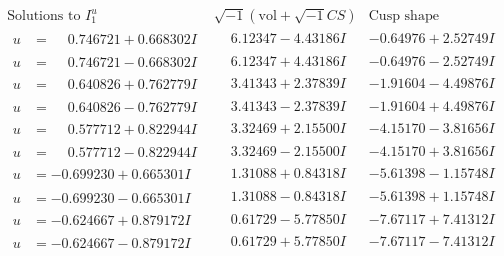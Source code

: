 \documentclass[1p]{elsarticle_modified}
\theoremstyle{definition}
\newcommand{\I}{\sqrt{-1}}
\begin{document}
$$\begin{array}{c|c|c}  
\text{Solutions to }I^u_{1}& \I (\text{vol} + \sqrt{-1}CS) & \text{Cusp shape}\\
 \hline 
\begin{aligned}
u &= \phantom{-}0.746721 + 0.668302 I\end{aligned}
 & \phantom{-}6.12347 - 4.43186 I & -0.64976 + 2.52749 I \\ \hline\begin{aligned}
u &= \phantom{-}0.746721 - 0.668302 I\end{aligned}
 & \phantom{-}6.12347 + 4.43186 I & -0.64976 - 2.52749 I \\ \hline\begin{aligned}
u &= \phantom{-}0.640826 + 0.762779 I\end{aligned}
 & \phantom{-}3.41343 + 2.37839 I & -1.91604 - 4.49876 I \\ \hline\begin{aligned}
u &= \phantom{-}0.640826 - 0.762779 I\end{aligned}
 & \phantom{-}3.41343 - 2.37839 I & -1.91604 + 4.49876 I \\ \hline\begin{aligned}
u &= \phantom{-}0.577712 + 0.822944 I\end{aligned}
 & \phantom{-}3.32469 + 2.15500 I & -4.15170 - 3.81656 I \\ \hline\begin{aligned}
u &= \phantom{-}0.577712 - 0.822944 I\end{aligned}
 & \phantom{-}3.32469 - 2.15500 I & -4.15170 + 3.81656 I \\ \hline\begin{aligned}
u &= -0.699230 + 0.665301 I\end{aligned}
 & \phantom{-}1.31088 + 0.84318 I & -5.61398 - 1.15748 I \\ \hline\begin{aligned}
u &= -0.699230 - 0.665301 I\end{aligned}
 & \phantom{-}1.31088 - 0.84318 I & -5.61398 + 1.15748 I \\ \hline\begin{aligned}
u &= -0.624667 + 0.879172 I\end{aligned}
 & \phantom{-}0.61729 - 5.77850 I & -7.67117 + 7.41312 I \\ \hline\begin{aligned}
u &= -0.624667 - 0.879172 I\end{aligned}
 & \phantom{-}0.61729 + 5.77850 I & -7.67117 - 7.41312 I \\ \hline\begin{aligned}

\end{aligned}
\end{array}$$
\end{document}
